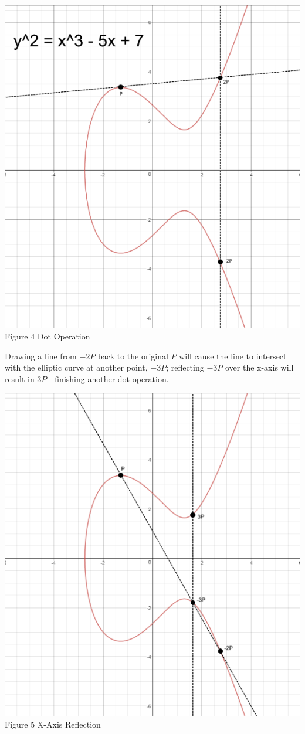 \documentclass[conference,compsoc]{IEEEtran}
\begin{document}
\begin{center}
\includegraphics[scale = .515]{graph2.png}
\small {Figure 4 Dot Operation}
\break
\end{center}
Drawing a line from $-2P$ back to the original $P$ will cause the line to intersect with the elliptic curve at another point, $-3P$; reflecting $-3P$ over the x-axis will result in $3P$ - finishing another dot operation.
\begin{center}
\includegraphics[scale = .54]{graph3.png}
\break
\small{Figure 5 X-Axis Reflection}
\break
\end{center}
\end{document}
